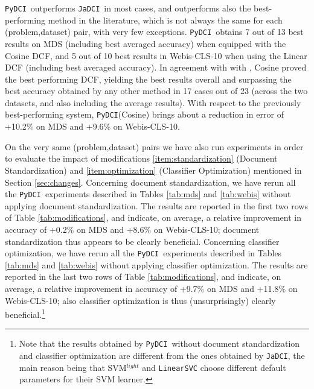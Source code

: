 \documentclass{article}
\newcommand{\jadci}{\texttt{JaDCI}}
\newcommand{\pydci}{\texttt{PyDCI}}
\begin{document}
\pydci\ outperforms \jadci\ in most cases, and outperforms also the
best-performing method in the literature, which is not always the same
for each (problem,dataset) pair, with very few exceptions.  \pydci\
obtains 7 out of 13 best results on MDS (including best averaged
accuracy) when equipped with the Cosine DCF, and 5 out of 10 best
results in Webis-CLS-10 when using the Linear DCF (including best
averaged accuracy).  In agreement with with \citep{Moreo:2016fg},
Cosine proved the best performing DCF, yielding the best results
overall and surpassing the best accuracy obtained by any other method
in 17 cases out of 23 (across the two datasets, and also including the
average results).  With respect to the previously best-performing
system, \pydci(Cosine) brings about a reduction in error of +10.2\% on
MDS and +9.6\% on Webis-CLS-10.

On the very same (problem,dataset) pairs we have also run experiments
in order to evaluate the impact of modifications
\ref{item:standardization} (Document Standardization) and
\ref{item:optimization} (Classifier Optimization) mentioned in Section
\ref{sec:changes}. Concerning document standardization, we have rerun
all the \pydci\ experiments described in Tables \ref{tab:mds} and
\ref{tab:webis} without applying document standardization. The results
are reported in the first two rows of Table \ref{tab:modifications},
and indicate, on average, a relative improvement in accuracy of +0.2\%
on MDS and +8.6\% on Webis-CLS-10; document standardization thus
appears to be clearly beneficial. Concerning classifier optimization,
we have rerun all the \pydci\ experiments described in Tables
\ref{tab:mds} and \ref{tab:webis} without applying classifier
optimization. The results are reported in the last two rows of Table
\ref{tab:modifications}, and indicate, on average, a relative
improvement in accuracy of +9.7\% on MDS and +11.8\% on Webis-CLS-10;
also classifier optimization is thus (unsurprisingly) clearly
beneficial.\footnote{Note that the results obtained by \pydci\ without
document standardization and classifier optimization are different
from the ones obtained by \jadci, the main reason being that
SVM$^{light}$ and \texttt{LinearSVC} choose different default
parameters for their SVM learner.}
\end{document}
